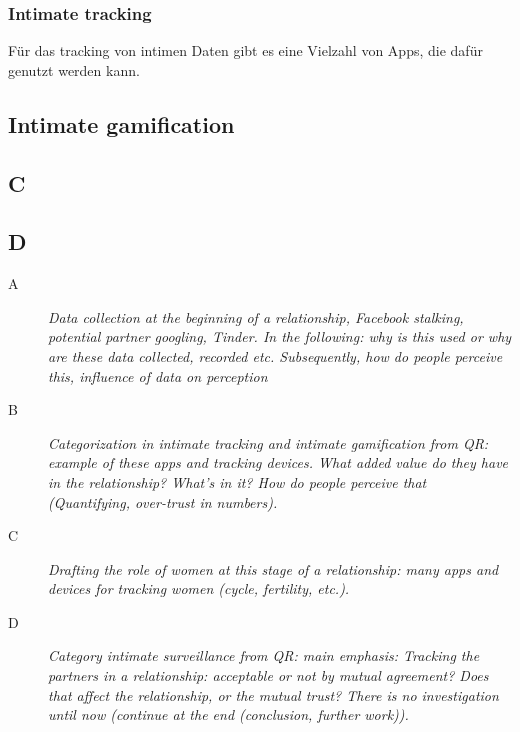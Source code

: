 \subsubsection{Intimate tracking}
Für das tracking von intimen Daten gibt es eine Vielzahl von Apps, die dafür genutzt werden kann.

\subsection{Intimate gamification}

\subsection{C}
\subsection{D}
\label{subsec:D}
\begin{description}
	\item[A] \textit{Data collection at the beginning of a relationship, Facebook stalking, potential partner googling, Tinder. In the following: why is this used or why are these data collected, recorded etc. Subsequently, how do people perceive this, influence of data on perception}
	\item[B] \textit{Categorization in intimate tracking and intimate gamification from \acl{QR}: example of these apps and tracking devices. What added value do they have in the relationship? What's in it? How do people perceive that (Quantifying, over-trust in numbers).}
	\item[C] \textit{Drafting the role of women at this stage of a relationship: many apps and devices for tracking women (cycle, fertility, etc.).}
	\item[D] \textit{Category intimate surveillance from \acl{QR}: main emphasis:
	Tracking the partners in a relationship: acceptable or not by mutual agreement? Does that affect the relationship, or the mutual trust? There is no investigation until now (continue at the end (conclusion, further work)).}
\end{description}